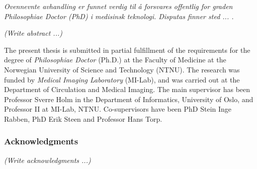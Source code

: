 \documentclass[10pt,b5paper,twoside]{book}
\newcommand\todo[1]{{\textit{\color{red}(#1)}}}
\begin{document}
\vspace{0.2cm}
\noindent \emph{Ovennevnte avhandling er funnet verdig til \aa{} forsvares offentlig for graden Philosophiae Doctor (PhD) i medisinsk teknologi. Disputas finner sted ... .}



\todo{Write abstract ...}




%
The present thesis is submitted in partial fulfillment of the requirements for the degree of \textit{Philosophiae Doctor} (Ph.D.) at the Faculty of Medicine at the Norwegian University of Science and Technology (NTNU). The research was funded by \textit{Medical Imaging Laboratory} (MI-Lab), and was carried out at the Department of Circulation and Medical Imaging. The main supervisor has been Professor Sverre Holm  in the Department of Informatics, University of Oslo, and Professor II at MI-Lab, NTNU. Co-supervisors have been PhD Stein Inge Rabben, PhD Erik Steen and Professor Hans Torp.


\subsubsection{Acknowledgments}
\todo{Write acknowledgments ...}

\end{document}
